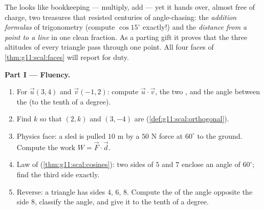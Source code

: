 \begin{problem}
\label{pb:g11:scal:1}
The  looks like bookkeeping --- multiply, add ---
yet it hands over, almost free of charge, two treasures that
resisted centuries of angle-chasing: the \emph{addition formulas}
of trigonometry (compute $\cos 15^\circ$ exactly!) and the
\emph{distance from a point to a line} in one clean fraction. As
a parting gift it proves that the three altitudes of every
triangle pass through one point. All four faces of
\cref{thm:g11:scal:faces} will report for duty.

\medskip
\noindent\textbf{Part I --- Fluency.}
\begin{enumerate}
  \item For $\vec u(3, 4)$ and $\vec v(-1, 2)$: compute
        $\vec u \cdot \vec v$, the two , and the angle
        between the  (to the tenth of a degree).
  \item Find $k$ so that $(2, k)$ and $(3, -4)$ are 
        (\cref{def:g11:scal:orthogonal}).
  \item Physics face: a sled is pulled $10$ m by a $50$ N force
        at $60^\circ$ to the ground. Compute the work
        $W = \vec F \cdot \vec d$.
  \item Law of  (\cref{thm:g11:scal:cosines}): two sides
        of $5$ and $7$ enclose an angle of $60^\circ$; find the
        third side exactly.
  \item Reverse: a triangle has sides $4$, $6$, $8$. Compute the
         of the angle opposite the side $8$, classify the
        angle, and give it to the tenth of a degree.
\end{enumerate}


\end{problem}
